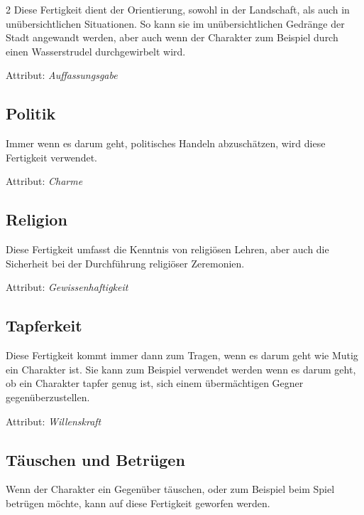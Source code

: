 \begin{multicols}{2}
Diese Fertigkeit dient der Orientierung, sowohl in der Landschaft, als auch in unübersichtlichen Situationen. So kann sie im unübersichtlichen Gedränge der Stadt angewandt werden, aber auch wenn der Charakter zum Beispiel durch einen Wasserstrudel durchgewirbelt wird.

Attribut: \textit{Auffassungsgabe}

\subsection{Politik}

Immer wenn es darum geht, politisches Handeln abzuschätzen, wird diese Fertigkeit verwendet.

Attribut: \textit{Charme}

\subsection{Religion}

Diese Fertigkeit umfasst die Kenntnis von religiösen Lehren, aber auch die Sicherheit bei der Durchführung religiöser Zeremonien.

Attribut: \textit{Gewissenhaftigkeit}

\subsection{Tapferkeit}

Diese Fertigkeit kommt immer dann zum Tragen, wenn es darum geht wie Mutig ein Charakter ist. Sie kann zum Beispiel verwendet werden wenn es darum geht, ob ein Charakter tapfer genug ist, sich einem übermächtigen Gegner gegenüberzustellen.

Attribut: \textit{Willenskraft}

\subsection{Täuschen und Betrügen}

Wenn der Charakter ein Gegenüber täuschen, oder zum Beispiel beim Spiel betrügen möchte, kann auf diese Fertigkeit geworfen werden.


\end{multicols}

